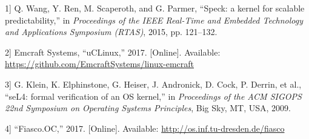 \protect{}\label{cite:3-1}

\noindent {[}1{]} Q. Wang, Y. Ren, M. Scaperoth, and G. Parmer, ``Speck: a kernel for scalable predictability,'' in \textit{Proceedings of the IEEE Real-Time and Embedded Technology and Applications Symposium (RTAS)}, 2015, pp. 121--132.

\protect{}\label{cite:3-2}

\noindent {[}2{]} Emcraft Systems, ``uCLinux,'' 2017. [Online]. Available: \url{https://github.com/EmcraftSystems/linux-emcraft}

\protect{}\label{cite:3-3}

\noindent {[}3{]} G. Klein, K. Elphinstone, G. Heiser, J. Andronick, D. Cock, P. Derrin, et al., ``seL4: formal verification of an OS kernel,'' in \textit{Proceedings of the ACM SIGOPS 22nd Symposium on Operating Systems Principles}, Big Sky, MT, USA, 2009.

\protect{}\label{cite:3-4}

\noindent {[}4{]} ``Fiasco.OC,'' 2017. [Online]. Available: \url{http://os.inf.tu-dresden.de/fiasco}


